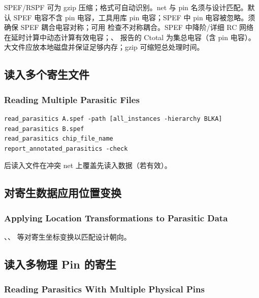 SPEF/RSPF 可为 gzip 压缩；格式可自动识别。net 与 pin 名须与设计匹配。默认 SPEF 电容不含 pin 电容，工具用库 pin 电容；SPEF 中 pin 电容被忽略。须确保 SPEF 耦合电容对称；可用  检查不对称耦合。SPEF 中降阶/详细 RC 网络在延时计算中动态计算有效电容；、 报告的 Ctotal 为集总电容（含 pin 电容）。大文件应放本地磁盘并保证足够内存；gzip 可缩短总处理时间。

\subsection{读入多个寄生文件}
\subsubsection*{Reading Multiple Parasitic Files}

\begin{lstlisting}
read_parasitics A.spef -path [all_instances -hierarchy BLKA]
read_parasitics B.spef
read_parasitics chip_file_name
report_annotated_parasitics -check
\end{lstlisting}

后读入文件在冲突 net 上覆盖先读入数据（若有效）。

\subsection{对寄生数据应用位置变换}
\subsubsection*{Applying Location Transformations to Parasitic Data}

、、 等对寄生坐标变换以匹配设计朝向。

\subsection{读入多物理 Pin 的寄生}
\subsubsection*{Reading Parasitics With Multiple Physical Pins}

